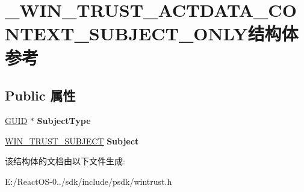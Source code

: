 \hypertarget{struct___w_i_n___t_r_u_s_t___a_c_t_d_a_t_a___c_o_n_t_e_x_t___s_u_b_j_e_c_t___o_n_l_y}{}\section{\+\_\+\+W\+I\+N\+\_\+\+T\+R\+U\+S\+T\+\_\+\+A\+C\+T\+D\+A\+T\+A\+\_\+\+C\+O\+N\+T\+E\+X\+T\+\_\+\+S\+U\+B\+J\+E\+C\+T\+\_\+\+O\+N\+L\+Y结构体 参考}
\label{struct___w_i_n___t_r_u_s_t___a_c_t_d_a_t_a___c_o_n_t_e_x_t___s_u_b_j_e_c_t___o_n_l_y}
\subsection*{Public 属性}
\begin{DoxyCompactItemize}
\item 
\mbox{\label{struct___w_i_n___t_r_u_s_t___a_c_t_d_a_t_a___c_o_n_t_e_x_t___s_u_b_j_e_c_t___o_n_l_y_ab733f582ae474b2e5f5ad05594bba8f1}} 
\hyperlink{interface_g_u_i_d}{G\+U\+ID} $\ast$ {\bfseries Subject\+Type}
\item 
\mbox{\label{struct___w_i_n___t_r_u_s_t___a_c_t_d_a_t_a___c_o_n_t_e_x_t___s_u_b_j_e_c_t___o_n_l_y_a7f1b6381fd87bc938f6a512f7b90a1a9}} 
\hyperlink{interfacevoid}{W\+I\+N\+\_\+\+T\+R\+U\+S\+T\+\_\+\+S\+U\+B\+J\+E\+CT} {\bfseries Subject}
\end{DoxyCompactItemize}


该结构体的文档由以下文件生成\+:\begin{DoxyCompactItemize}
\item 
E\+:/\+React\+O\+S-\/0../sdk/include/psdk/wintrust.\+h\end{DoxyCompactItemize}
